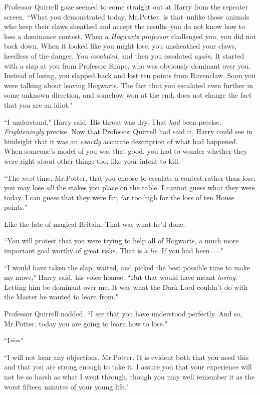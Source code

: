 Professor Quirrell gaze seemed to come straight out at Harry from the repeater screen. ``What you demonstrated today, Mr.\?Potter, is that\---unlike those animals who keep their claws sheathed and accept the results\---you do not know how to lose a dominance contest. When a \emph{Hogwarts professor} challenged you, you did not back down. When it looked like you might lose, you unsheathed your claws, heedless of the danger. You \emph{escalated}, and then you escalated \emph{again}. It started with a slap at you from Professor Snape, who was obviously dominant over you. Instead of losing, you slapped back and lost ten points from Ravenclaw. Soon you were talking about leaving Hogwarts. The fact that you escalated even further in some unknown direction, and somehow won at the end, does not change the fact that you are an idiot."

``I understand," Harry said. His throat was dry. That \emph{had} been precise. \emph{Frighteningly} precise. Now that Professor Quirrell had said it, Harry could see in hindsight that it was an \emph{exactly} accurate description of what had happened. When someone's model of you was that good, you had to wonder whether they were right about other things too, like your intent to kill.

``The \emph{next} time, Mr.\?Potter, that you choose to escalate a contest rather than lose, you may lose \emph{all} the stakes you place on the table. I cannot guess what they were today. I can guess that they were far, far too high for the loss of ten House points."

Like the fate of magical Britain. That was what he'd done.

``You will protest that you were trying to help all of Hogwarts, a much more important goal worthy of great risks. That is a \emph{lie}. If you had been\==="

``I would have taken the slap, waited, and picked the best possible time to make my move," Harry said, his voice hoarse. ``But that would have meant \emph{losing}. Letting him be dominant over me. It was what the Dark Lord couldn't do with the Master he wanted to learn from."

Professor Quirrell nodded. ``I see that you have understood perfectly. And so, Mr.\?Potter, today you are going to learn how to lose."

``I\==="

``I will not hear any objections, Mr.\?Potter. It is evident both that you need this and that you are strong enough to take it. I assure you that your experience will not be so harsh as what I went through, though you may well remember it as the worst fifteen minutes of your young life."

